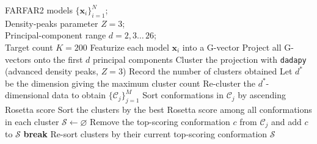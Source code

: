 \documentclass[%
aip,
 amsmath,amssymb,
reprint,%
onecolumn,
]{revtex4-1}
\begin{document}
{\begin{algorithm}[H]
  \caption{Unsupervised Selection of Diverse Candidate conformations}
  \label{alg:candidate-selection}
  \begin{algorithmic}[1]
    \REQUIRE FARFAR2 models $\{\mathbf{x}_i\}_{i=1}^{N}$; \\
    Density‐peaks parameter $Z{=}3$;\\
    Principal-component range $d\!=\!2,3\ldots\,26$;\\
    Target count $K{=}200$
    \STATE Featurize each model $\mathbf{x}_i$ into a G-vector
      \STATE Project all G-vectors onto the first $d$ principal components
      \STATE Cluster the projection with \texttt{dadapy} (advanced density peaks, $Z{=}3$)
      \STATE Record the number of clusters obtained
    \ENDFOR
    \STATE Let $d^\ast$ be the dimension giving the maximum cluster count 
    \STATE Re-cluster the $d^\ast$-dimensional data to obtain $\{\mathcal{C}_j\}_{j=1}^{M}$
      \STATE Sort conformations in $\mathcal{C}_j$ by ascending Rosetta score
    \ENDFOR
    \STATE Sort the clusters by the best Rosetta score among all conformations in each cluster
    \STATE $\mathcal{S} \leftarrow \varnothing$ 
          \STATE Remove the top-scoring conformation $c$ from $\mathcal{C}_j$ and add $c$ to $\mathcal{S}$
            \STATE \textbf{break}
          \ENDIF
        \ENDIF
      \ENDFOR
      \STATE Re-sort clusters by their current top-scoring conformation
    \ENDWHILE
    \RETURN $\mathcal{S}$ 
  \end{algorithmic}
\end{algorithm}

}
\end{document}

